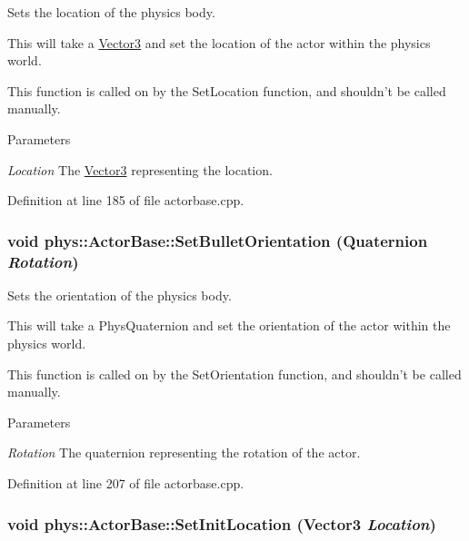 Sets the location of the physics body. 

This will take a \hyperlink{classphys_1_1Vector3}{Vector3} and set the location of the actor within the physics world. \par
 This function is called on by the SetLocation function, and shouldn't be called manually. 
\begin{DoxyParams}{Parameters}
\item[{\em Location}]The \hyperlink{classphys_1_1Vector3}{Vector3} representing the location. \end{DoxyParams}


Definition at line 185 of file actorbase.cpp.

\hypertarget{classphys_1_1ActorBase_a492244ac46ced53b809f436da992bc84}{
\subsubsection[{SetBulletOrientation}]{\setlength{\rightskip}{0pt plus 5cm}void phys::ActorBase::SetBulletOrientation ({\bf Quaternion} {\em Rotation})}}
\label{d8/d0f/classphys_1_1ActorBase_a492244ac46ced53b809f436da992bc84}


Sets the orientation of the physics body. 

This will take a PhysQuaternion and set the orientation of the actor within the physics world. \par
 This function is called on by the SetOrientation function, and shouldn't be called manually. 
\begin{DoxyParams}{Parameters}
\item[{\em Rotation}]The quaternion representing the rotation of the actor. \end{DoxyParams}


Definition at line 207 of file actorbase.cpp.

\hypertarget{classphys_1_1ActorBase_a0ff0980bcf33a8205eb058b8caa1f36b}{
\subsubsection[{SetInitLocation}]{\setlength{\rightskip}{0pt plus 5cm}void phys::ActorBase::SetInitLocation ({\bf Vector3} {\em Location})}}
\label{d8/d0f/classphys_1_1ActorBase_a0ff0980bcf33a8205eb058b8caa1f36b}


